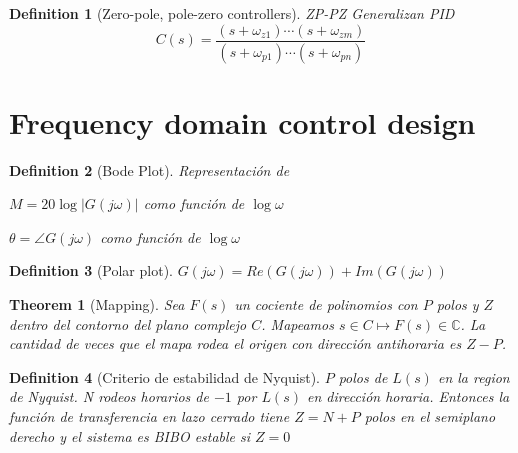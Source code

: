 \documentclass[leqno]{article}
\newtheorem*{theorem}{Theorem}
\newtheorem*{definition}{Definition}
\begin{document}
\begin{definition}[Zero-pole, pole-zero controllers] ZP-PZ Generalizan PID
  \[
  C(s) = \frac{(s+\omega _{z1})\cdots (s+\omega_{zm})}{(s+\omega _{p 1})\cdots(s+\omega _{pn})}
  \] 
\end{definition}

\section{Frequency domain control design}
\begin{definition}[Bode Plot] Representación de
\item $M=20\log |G(j\omega)|$ como función de $\log\omega $
\item $\theta =\angle G(j\omega )$ como función de $\log\omega$
\end{definition}

\begin{definition}[Polar plot] $G(j\omega ) = Re(G(j\omega ))+ Im(G(j\omega ))$
\end{definition}

\begin{theorem}[Mapping] Sea $F(s)$ un cociente de polinomios con $P$ polos y  $Z$ dentro del contorno del plano complejo $C$. Mapeamos $s\in C \mapsto F(s)\in \mathbb{C}$. La cantidad de veces que el mapa rodea el origen con dirección antihoraria es $Z-P$.
\end{theorem}

\begin{definition}[Criterio de estabilidad de Nyquist]
$P$ polos de $L(s)$ en la region de Nyquist. N rodeos horarios de  $-1$ por  $L(s)$ en dirección horaria. Entonces la función de transferencia en lazo cerrado tiene  $Z = N+P$ polos en el semiplano  derecho y el sistema es BIBO estable si  $Z=0$
\end{definition}
\end{document}
